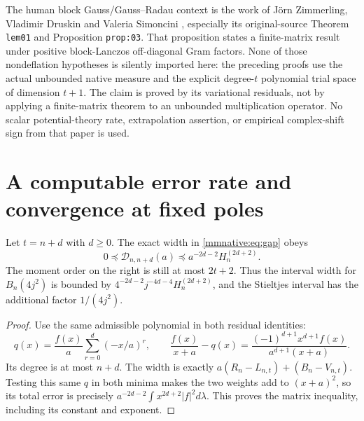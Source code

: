 The human block Gauss/Gauss--Radau context is the work of J\"orn
Zimmerling, Vladimir Druskin and Valeria Simoncini \cite{mmnative:ZDS},
especially its original-source Theorem \texttt{lem01} and Proposition
\texttt{prop:03}.  That proposition states a finite-matrix result
under positive block-Lanczos off-diagonal Gram factors.  None of those
nondeflation hypotheses is silently imported here: the preceding
proofs use the actual unbounded native measure and the explicit
degree-$t$ polynomial trial space of dimension $t+1$.  The claim is
proved by its variational residuals, not by applying a finite-matrix
theorem to an unbounded multiplication operator.  No scalar
potential-theory rate, extrapolation assertion, or empirical
complex-shift sign from that paper is used.

\section{A computable error rate and convergence at fixed poles}

\begin{mmnativetheorem}\label{mmnative:thm:rate}
Let $t=n+d$ with $d\ge0$.  The exact width in \eqref{mmnative:eq:gap} obeys
\begin{equation}\label{mmnative:eq:rate}
 \boxed{0\preceq\mathcal D_{n,n+d}(a)
 \preceq a^{-2d-2}H_n^{(2d+2)}.}
\end{equation}
The moment order on the right is still at most $2t+2$.
Thus the interval width for $B_n(4j^2)$ is bounded by
$4^{-2d-2}j^{-4d-4}H_n^{(2d+2)}$, and the Stieltjes interval has
the additional factor $1/(4j^2)$.
\end{mmnativetheorem}
\begin{proof}
Use the same admissible polynomial in both residual identities:
\[
 q(x)=\frac{f(x)}a\sum_{r=0}^d(-x/a)^r,
 \qquad\frac{f(x)}{x+a}-q(x)
 =\frac{(-1)^{d+1}x^{d+1}f(x)}{a^{d+1}(x+a)}.
\]
Its degree is at most $n+d$.  The width is exactly
$a(R_n-L_{n,t})+(B_n-V_{n,t})$.  Testing this same $q$ in both
minima makes the two weights add to $(x+a)^2$, so its total error
is precisely
$a^{-2d-2}\int x^{2d+2}|f|^2d\lambda$.  This proves the matrix
inequality, including its constant and exponent.
\end{proof}

